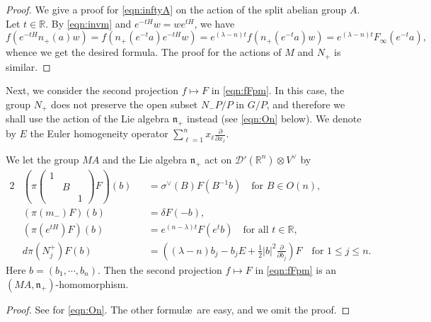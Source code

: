 \begin{proof}
We give a proof for \eqref{eqn:inftyA} on the action
 of the split abelian group $A$.  
Let $t \in {\mathbb{R}}$. 
By \eqref{eqn:invm}
 and 
$
e^{-tH} w =w e^{tH}
$, 
 we have 
\[
f(e^{-tH} n_+(a) w)
=f(n_+(e^{-t}a)e^{-tH}w)
=e^{(\lambda-n)t} f(n_+(e^{-t}a)w)
=e^{(\lambda-n)t} F_{\infty}(e^{-t} a), 
\]
whence we get the desired formula.  
The proof for the actions of $M$ and $N_+$ is similar.  
\end{proof}



Next,
 we consider the second projection $f \mapsto F$
 in \eqref{eqn:fFpm}.  
In this case,
 the group $N_+$ does not preserve the open subset
 $N_-P/P$ in $G/P$, 
 and therefore we shall use the action 
 of the Lie algebra ${\mathfrak {n}}_+$ instead
 (see \eqref{eqn:On} below).  
We denote by 
$
E
$ 
 the Euler homogeneity operator
 $\sum_{\ell=1}^n x_\ell \frac{\partial}{\partial x_\ell}$.  
\begin{lemma}
\label{lem:20161104}
We let the group $MA$ and the Lie algebra ${\mathfrak{n}}_+$
 act on
 ${\mathcal{D}}'({\mathbb{R}}^n) \otimes V^{\vee}$
 by 
\begin{alignat}{2}
& \left(\pi \begin{pmatrix} 1 & & \\ & B & \\ & & 1 \end{pmatrix}  F\right)(b)
&&=\sigma^{\vee}(B) F(B^{-1} b)
\quad
\text{for $B \in O(n)$}, 
\label{eqn:0M}
\\
& (\pi(m_-) F)(b)
&&=
\delta F(-b), 
\label{eqn:0m}
\\
& (\pi (e^{tH})F)(b)
&&=
e^{(n-\lambda) t}F(e^t b)
\quad
\text{for all $t \in {\mathbb{R}}$}, 
\label{eqn:0A}
\\
& d\pi (N_j^+)F(b)
&&=
\left((\lambda-n)b_j - b_j E 
 + \frac 1 2 |b|^2 \frac{\partial}{\partial b_j}\right) F
\quad
\text{for $1 \le j \le n$}.  
\label{eqn:On}
\end{alignat}
Here $b=(b_1, \cdots, b_n)$.  
Then the second projection $f \mapsto F$
 in \eqref{eqn:fFpm}
 is an $(M A, {\mathfrak {n}}_+)$-homomorphism.  
\end{lemma}

\begin{proof}
See \cite[Prop.~6.4]{sbon}
for \eqref{eqn:On}.  
The other formul\ae\ are easy, 
 and we omit the proof.  
\end{proof}



